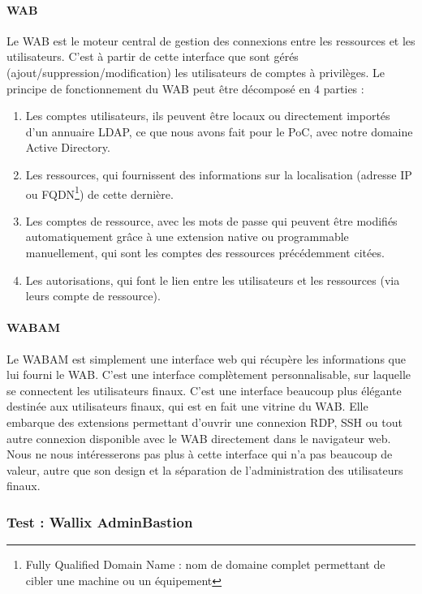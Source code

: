 \paragraph{WAB}
Le WAB est le moteur central de gestion des connexions entre les ressources et les utilisateurs. C'est à partir de cette interface que sont gérés (ajout/suppression/modification) les utilisateurs de comptes à privilèges. Le principe de fonctionnement du WAB peut être décomposé en 4 parties :
\begin{enumerate}
	\item Les comptes utilisateurs, ils peuvent être locaux ou directement importés d'un annuaire LDAP, ce que nous avons fait pour le PoC, avec notre domaine Active Directory.
	\item Les ressources, qui fournissent des informations sur la localisation (adresse IP ou FQDN\footnote{Fully Qualified Domain Name : nom de domaine complet permettant de cibler une machine ou un équipement}) de cette dernière.
	\item Les comptes de ressource, avec les mots de passe qui peuvent être modifiés automatiquement grâce à une extension native ou programmable manuellement, qui sont les comptes des ressources précédemment citées.
	\item Les autorisations, qui font le lien entre les utilisateurs et les ressources (via leurs compte de ressource).
\end{enumerate}

\paragraph{WABAM}
Le WABAM est simplement une interface web qui récupère les informations que lui fourni le WAB. C'est une interface complètement personnalisable, sur laquelle se connectent les utilisateurs finaux. C'est une interface beaucoup plus élégante destinée aux utilisateurs finaux, qui est en fait une vitrine du WAB. Elle embarque des extensions permettant d'ouvrir une connexion RDP, SSH ou tout autre connexion disponible avec le WAB directement dans le navigateur web. Nous ne nous intéresserons pas plus à cette interface qui n'a pas beaucoup de valeur, autre que son design et la séparation de l'administration des utilisateurs finaux.

\subsubsection{Test : Wallix AdminBastion}
\label{par:testwallix}

